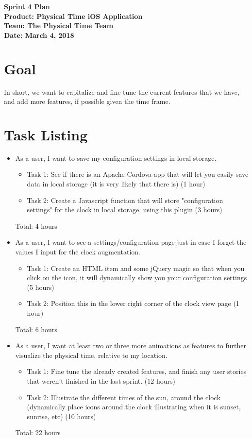 \documentclass[11pt]{article}
\newcommand\tab[1][1cm]{\hspace*{#1}}
\begin{document}
	\Large{\textbf{Sprint 4 Plan}}\\
	\Large{\textbf{Product: Physical Time iOS Application}}\\
	\Large{\textbf{Team: The Physical Time Team}}\\
	\Large{\textbf{Date: March 4, 2018}}\\
	
	\vspace{-3mm}
	
	\section{Goal}
		\vspace{-3mm}
		\tab \normalsize{In short, we want to capitalize and fine tune the current features that we have, and add more features, if possible given the time frame.}

	\section{Task Listing}
		\vspace{-3mm}
		\begin{itemize}
			\item As a user, I want to save my configuration settings in local storage.
			\begin{itemize}
			    \item Task 1: See if there is an Apache Cordova app that will let you easily save data in local storage (it is very likely that there is) (1 hour) 
			    \item Task 2: Create a Javascript function that will store "configuration settings" for the clock in local storage, using this plugin (3 hours)
			\end{itemize}
			Total: 4 hours
			\item As a user, I want to see a settings/configuration page just in case I forget the values I input for the clock augmentation.
			\begin{itemize}
			    \item Task 1: Create an HTML item and some jQuery magic so that when you click on the icon, it will dynamically show you your configuration settings (5 hours)
			    \item Task 2: Position this in the lower right corner of the clock view page (1 hour)
			\end{itemize}
			Total: 6 hours
			\item As a user, I want at least two or three more animations as features to further visualize the physical time, relative to my location.
			\begin{itemize}
			    \item Task 1: Fine tune the already created features, and finish any user stories that weren't finished in the last sprint. (12 hours)
			    \item Task 2: Illustrate the different times of the sun, around the clock (dynamically place icons around the clock illustrating when it is sunset, sunrise, etc) (10 hours)
			\end{itemize}
			 Total: 22 hours
		\end{itemize}
		
\end{document}
